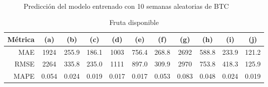 \documentclass[a4paper,10pt]{article}
\begin{document}
\begin{figure}
    \\
  \caption{Predicción del modelo entrenado con 10 semanas aleatorias de BTC}
  \label{f:btc_mth_arima}
\end{figure}

\begin{table}[t]
 \begin{center}
  \begin{tabular}{|r|c|c|c|c|c|c|c|c|c|c|}
    Métrica & (a) & (b) & (c) & (d) & (e) & (f) & (g) & (h) & (i) & (j) \\ \hline
    MAE & 1924 & 255.9 & 186.1 & 1003 & 756.4 & 268.8 & 2692 & 588.8 & 233.9 & 121.2 \\
    RMSE & 2264 & 335.8 & 235.0 & 1111 & 897.0 & 309.9 & 2970 & 753.8 & 418.3 & 125.9 \\
    MAPE & 0.054 & 0.024 & 0.019 & 0.017 & 0.017 & 0.053 & 0.083 & 0.048 & 0.024 & 0.019 \\ \hline
  \end{tabular}
  \caption{Fruta disponible}
  \label{tab:btc}
 \end{center}
\end{table}
\end{document}
